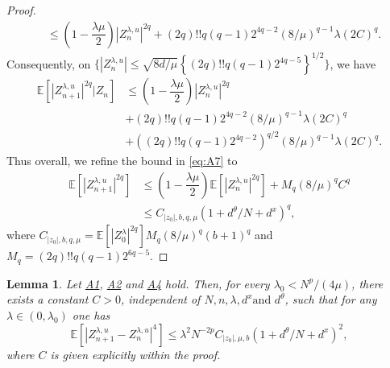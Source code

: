 \documentclass[a4paper, 10pt]{article}
\theoremstyle{plain}%
\newtheorem{lemma}{Lemma}%
\begin{document}
\begin{proof}
\begin{align*}
&\leq   \left(1-\dfrac{\lambda\mu}{2}\right)|Z_n^{\lambda,u}|^{2q}+(2q)!!q(q-1)2^{4q-2}(8/\mu)^{q-1}\lambda(2C)^q.
\end{align*}
Consequently, on $\{|Z_n^{\lambda,u}|\leq \sqrt{8d/\mu}\left\{(2q)!!q(q-1)2^{4q-5}\right\}^{1/2}\}$, we have
\begin{align*}
\mathbb{E}\left[|Z_{n+1}^{\lambda,u}|^{2q}|Z_n\right]&\leq  \left(1-\dfrac{\lambda\mu}{2}\right)|Z_n^{\lambda,u}|^{2q}\\&+(2q)!!q(q-1)2^{4q-2}(8/\mu)^{q-1}\lambda(2C)^q\\&+\left((2q)!!q(q-1)2^{4q-2}\right)^{q/2}(8/\mu)^{q-1}\lambda(2C)^q.
\end{align*}
Thus overall, we refine the bound in \eqref{eq:A7} to
\begin{align*}
\mathbb{E}\left[|Z_{n+1}^{\lambda,u}|^{2q}\right]&\leq  \left(1-\dfrac{\lambda\mu}{2}\right)\mathbb{E}\left[|Z_n^{\lambda,u}|^{2q}\right] +M_q(8/\mu)^{q} C^q\\
&\leq C_{|z_0|,b,q,\mu}(1+d^{\theta}/N+d^x)^q,
\end{align*}
where $C_{|z_0|,b,q,\mu}=\mathbb{E}\left[|Z_{0}^{\lambda}|^{2q}\right]M_q(8/\mu)^q(b+1)^{q}$ and $M_q=(2q)!!q(q-1)2^{6q-5}$.
\end{proof}
\noindent \begin{lemma} Let \hyperlink{Assum1}{A1}, \hyperlink{Assum2}{A2} and \hyperlink{Assum4}{A4} hold. Then, for every $\lambda_0<N^{p}/(4\mu)$, there exists a constant $C>0$, independent of $N,n,\lambda,d^x \text{and }d^{\theta}$, such that for any $\lambda\in(0,\lambda_0)$ one has
$$\mathbb{E}\left[|Z^{\lambda,u}_{n+1}-Z^{\lambda,u}_{n}|^4\right]\leq \lambda^2N^{-2p} C_{|z_0|,\mu,b}(1+d^{\theta}/N+d^x)^2,$$where $C$ is given explicitly within the proof.\end{lemma}
\end{document}
